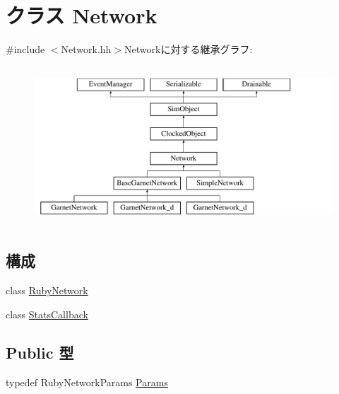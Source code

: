 \hypertarget{classNetwork}{
\section{クラス Network}
\label{classNetwork}
}


{\ttfamily \#include $<$Network.hh$>$}Networkに対する継承グラフ:\begin{figure}[H]
\begin{center}
\leavevmode
\includegraphics[height=6cm]{classNetwork}
\end{center}
\end{figure}
\subsection*{構成}
\begin{DoxyCompactItemize}
\item 
class \hyperlink{classNetwork_1_1RubyNetwork}{RubyNetwork}
\item 
class \hyperlink{classNetwork_1_1StatsCallback}{StatsCallback}
\end{DoxyCompactItemize}
\subsection*{Public 型}
\begin{DoxyCompactItemize}
\item 
typedef RubyNetworkParams \hyperlink{classNetwork_a5ebe6802acb5e6e05b54303c1004f080}{Params}
\end{DoxyCompactItemize}
